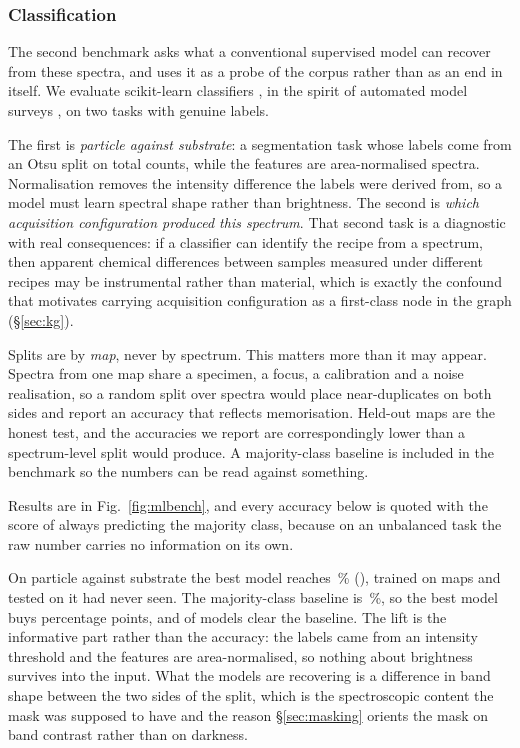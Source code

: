 \subsubsection{Classification}

The second benchmark asks what a conventional supervised model can recover from
these spectra, and uses it as a probe of the corpus rather than as an end in
itself. We evaluate \MLNmodels{} scikit-learn classifiers
\cite{pedregosa2011scikit}, in the spirit of automated model surveys
\cite{pandala2021lazypredict}, on two tasks with genuine labels.

The first is \emph{particle against substrate}: a segmentation task whose
labels come from an Otsu split on total counts, while the features are
area-normalised spectra. Normalisation removes the intensity difference the
labels were derived from, so a model must learn spectral shape rather than
brightness. The second is \emph{which acquisition configuration produced this
spectrum}. That second task is a diagnostic with real consequences: if a
classifier can identify the recipe from a spectrum, then apparent chemical
differences between samples measured under different recipes may be
instrumental rather than material, which is exactly the confound that
motivates carrying acquisition configuration as a first-class node in the graph
(\S\ref{sec:kg}).

Splits are by \emph{map}, never by spectrum. This matters more than it may
appear. Spectra from one map share a specimen, a focus, a calibration and a
noise realisation, so a random split over spectra would place near-duplicates
on both sides and report an accuracy that reflects memorisation. Held-out maps
are the honest test, and the accuracies we report are correspondingly lower
than a spectrum-level split would produce. A majority-class baseline is
included in the benchmark so the numbers can be read against something.

Results are in Fig.~\ref{fig:mlbench}, and every accuracy below is quoted with
the score of always predicting the majority class, because on an unbalanced
task the raw number carries no information on its own.

On particle against substrate the best model reaches \MLParticleAcc\,\%
(\MLParticleModel), trained on \MLParticleTrainMaps{} maps and tested on
\MLParticleTestMaps{} it had never seen. The majority-class baseline is
\MLParticleBase\,\%, so the best model buys \MLParticleLift{} percentage
points, and \MLParticleBeat{} of \MLNmodels{} models clear the baseline. The
lift is the informative part rather than the accuracy: the labels came from an
intensity threshold and the features are area-normalised, so nothing about
brightness survives into the input. What the models are recovering is a
difference in band shape between the two sides of the split, which is the
spectroscopic content the mask was supposed to have and the reason
\S\ref{sec:masking} orients the mask on band contrast rather than on darkness.


